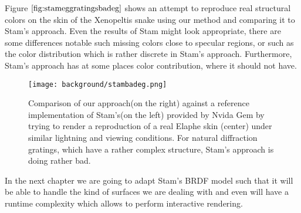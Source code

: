 Figure $\ref{fig:stameggratingsbadeg}$ shows an attempt to reproduce real structural colors on the skin of the Xenopeltis snake using our method and comparing it to Stam's approach. Even the results of Stam might look appropriate, there are some differences notable such missing colors close to specular regions, or such as the color distribution which is rather discrete in Stam's approach. Furthermore, Stam's approach has at some places color contribution, where it should not have.

\begin{figure}[H]
  \centering
  \texttt{[image: background/stambadeg.png]}
  \caption[Comparing Stam's approach: Bad Example]{Comparison of our approach(on the right) against a reference implementation of Stam's(on the left) provided by Nvida Gem by trying to render a reproduction of a real Elaphe skin (center) under similar lightning and viewing conditions. For natural diffraction gratings, which have a rather complex structure, Stam's approach is doing rather bad.}
  \label{fig:stameggratingsbadeg}  
\end{figure}

In the next chapter we are going to adapt Stam's BRDF model such that it will be able to handle the kind of surfaces we are dealing with and even will have a runtime complexity which allows to perform interactive rendering.

